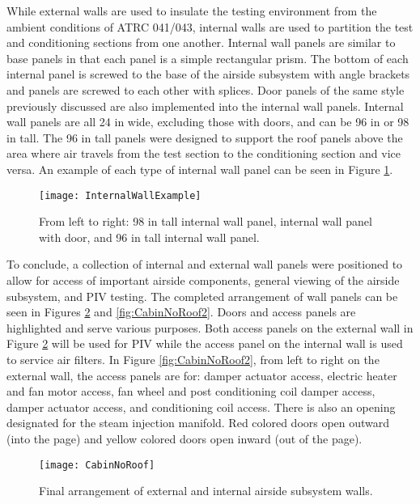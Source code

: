 \FloatBarrier

While external walls are used to insulate the testing environment from the ambient conditions of ATRC 041/043, internal walls are used to partition the test and conditioning sections from one another. Internal wall panels are similar to base panels in that each panel is a simple rectangular prism. The bottom of each internal panel is screwed to the base of the airside subsystem with angle brackets and panels are screwed to each other with splices. Door panels of the same style previously discussed are also implemented into the internal wall panels. Internal wall panels are all 24 in wide, excluding those with doors, and can be 96 in or 98 in tall. The 96 in tall panels were designed to support the roof panels above the area where air travels from the test section to the conditioning section and vice versa. An example of each type of internal wall panel can be seen in Figure \ref{fig:InternalWallExample}. 

\begin{figure} [h!]
\centering
\texttt{[image: InternalWallExample]}
\caption{From left to right: 98 in tall internal wall panel, internal wall panel with door, and 96 in tall internal wall panel.}
\label{fig:InternalWallExample}
\end{figure}

To conclude, a collection of internal and external wall panels were positioned to allow for access of important airside components, general viewing of the airside subsystem, and PIV testing. The completed arrangement of wall panels can be seen in Figures \ref{fig:CabinNoRoof} and \ref{fig:CabinNoRoof2}. Doors and access panels are highlighted and serve various purposes. Both access panels on the external wall in Figure \ref{fig:CabinNoRoof} will be used for PIV while the access panel on the internal wall is used to service air filters. In Figure \ref{fig:CabinNoRoof2}, from left to right on the external wall, the access panels are for: damper actuator access, electric heater and fan motor access, fan wheel and post conditioning coil damper access, damper actuator access, and conditioning coil access. There is also an opening designated for the steam injection manifold. Red colored doors open outward (into the page) and yellow colored doors open inward (out of the page). 

\begin{figure} [h!]
\centering
\texttt{[image: CabinNoRoof]}
\caption{Final arrangement of external and internal airside subsystem walls.}
\label{fig:CabinNoRoof}
\end{figure}

